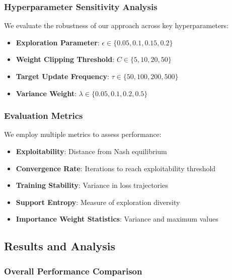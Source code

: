 \documentclass[12pt,a4paper]{article}
\begin{document}
\subsubsection{Hyperparameter Sensitivity Analysis}

We evaluate the robustness of our approach across key hyperparameters:

\begin{itemize}
\item \textbf{Exploration Parameter}: $\epsilon \in \{0.05, 0.1, 0.15, 0.2\}$
\item \textbf{Weight Clipping Threshold}: $C \in \{5, 10, 20, 50\}$
\item \textbf{Target Update Frequency}: $\tau \in \{50, 100, 200, 500\}$
\item \textbf{Variance Weight}: $\lambda \in \{0.05, 0.1, 0.2, 0.5\}$
\end{itemize}

\subsubsection{Evaluation Metrics}

We employ multiple metrics to assess performance:

\begin{itemize}
\item \textbf{Exploitability}: Distance from Nash equilibrium
\item \textbf{Convergence Rate}: Iterations to reach exploitability threshold
\item \textbf{Training Stability}: Variance in loss trajectories
\item \textbf{Support Entropy}: Measure of exploration diversity
\item \textbf{Importance Weight Statistics}: Variance and maximum values
\end{itemize}

\subsection{Results and Analysis}

\subsubsection{Overall Performance Comparison}
\end{document}
